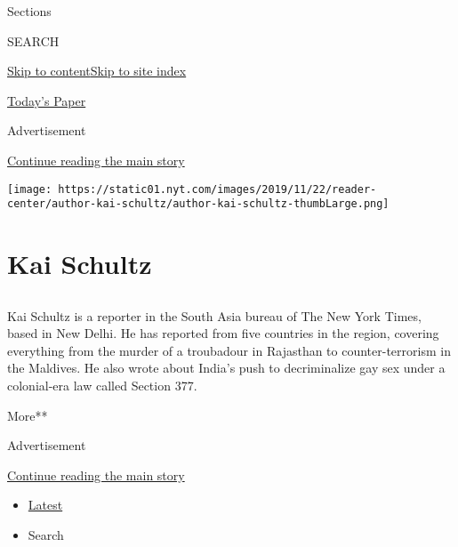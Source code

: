Sections

SEARCH

\protect\hyperlink{site-content}{Skip to
content}\protect\hyperlink{site-index}{Skip to site index}

\href{https://myaccount.nytimes.com/auth/login?response_type=cookie\&client_id=vi}{}

\href{https://www.nytimes.com/section/todayspaper}{Today's Paper}

Advertisement

\protect\hyperlink{after-top}{Continue reading the main story}

\texttt{[image: https://static01.nyt.com/images/2019/11/22/reader-center/author-kai-schultz/author-kai-schultz-thumbLarge.png]}

\hypertarget{kai-schultz}{%
\section{Kai Schultz}\label{kai-schultz}}

\subsection{}

Kai Schultz is a reporter in the South Asia bureau of The New York
Times, based in New Delhi. He has reported from five countries in the
region, covering everything from the murder of a troubadour in Rajasthan
to counter-terrorism in the Maldives. He also wrote about India's push
to decriminalize gay sex under a colonial-era law called Section 377.

More**

Advertisement

\protect\hyperlink{after-mid1}{Continue reading the main story}

\begin{itemize}
\tightlist
\item
  \protect\hyperlink{stream-panel}{Latest}
\item
  Search
\end{itemize}

